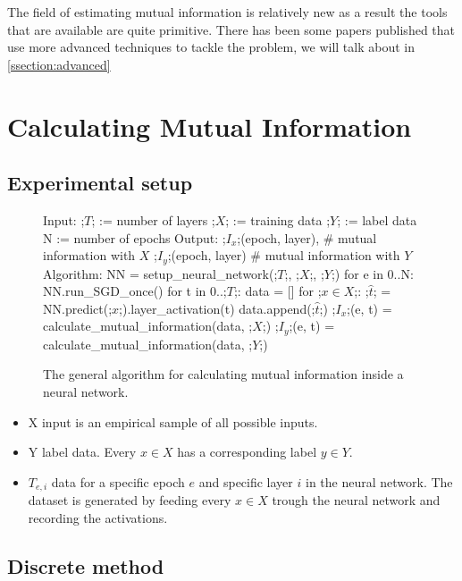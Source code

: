 The field of estimating mutual information is relatively new as a result the
tools that are available are quite primitive. There has been some papers
published that use more advanced techniques to tackle the problem, we will talk
about in \autoref{ssection:advanced}

\section{Calculating Mutual Information}

\subsection{Experimental setup}

\begin{figure}[h]
    \begin{pythonfigure}
      Input:
      ;$T$; := number of layers
      ;$X$; := training data
      ;$Y$; := label data
      N := number of epochs
      Output: 
      ;$I_x$;(epoch, layer), # mutual information with $X$ 
      ;$I_y$;(epoch, layer)  # mutual information with $Y$ 
      Algorithm:
      NN = setup_neural_network(;$T$;, ;$X$;, ;$Y$;)
      for e in 0..N:
        NN.run_SGD_once()
        for t in 0..;$T$;:
          data = []
          for ;$x \in X$;:
            ;$\hat{t}$; = NN.predict(;$x$;).layer_activation(t)
            data.append(;$\hat{t}$;)
          ;$I_x$;(e, t) = calculate_mutual_information(data, ;$X$;)
          ;$I_y$;(e, t) = calculate_mutual_information(data, ;$Y$;)
    \end{pythonfigure}
    \caption{The general algorithm for calculating mutual information inside a
    neural network.}
\end{figure}

\begin{itemize}
  \item{
      X input is an empirical sample of all possible inputs.
    }
  \item{
      Y label data. Every $x \in X$ has a corresponding label $y \in Y$. 
    }
  \item{
      $T_{e,i}$ data for a specific epoch $e$ and specific layer $i$ in the
      neural network. The dataset is  generated by feeding every $x \in X$
      trough the neural network and recording the activations.
    }
\end{itemize}

\newpage

\subsection{Discrete method} 


